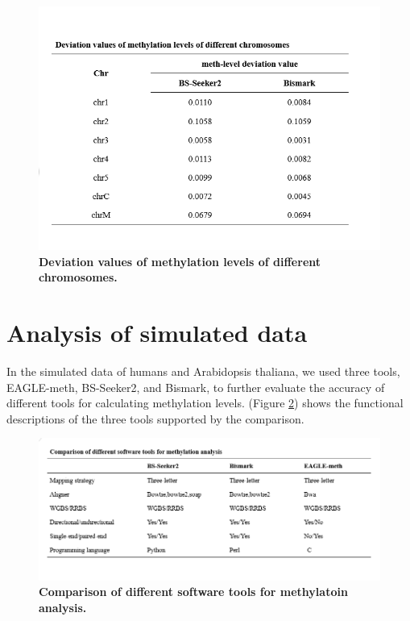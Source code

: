 \documentclass{PHlab-thesis}
\begin{document}
\begin{figure}[h]
  \centering
  \includegraphics[scale=1.0]{table/table5.png}
  \caption{\textbf{Deviation values of methylation levels of different chromosomes.}
  }
  \label{f12}
\end{figure}


\section{Analysis of simulated data}
In the simulated data of humans and Arabidopsis thaliana, we used three tools, EAGLE-meth, BS-Seeker2, and Bismark, to further evaluate the accuracy of different tools for calculating methylation levels. (Figure \ref{f13}) shows the functional descriptions of the three tools supported by the comparison.

\begin{figure}[h]
  \centering
  \includegraphics[scale=1.0]{table/table6.png}
  \caption{\textbf{Comparison of different software tools for methylatoin analysis.}}
  \label{f13}
\end{figure}
\end{document}
